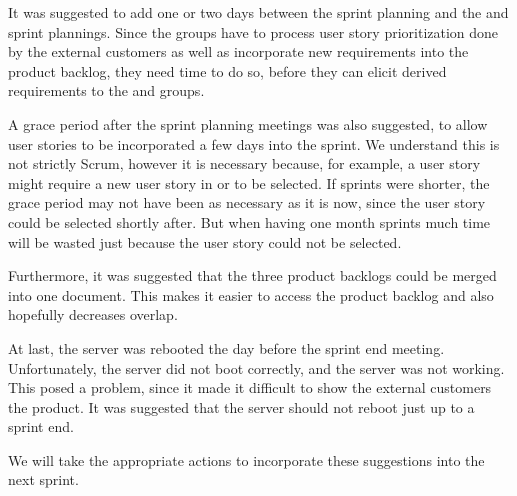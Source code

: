 It was suggested to add one or two days between the \gui sprint planning and the \db and \bd sprint plannings. Since the \gui groups have to process user story prioritization done by the external customers as well as incorporate new requirements into the product backlog, they need time to do so, before they can elicit derived requirements to the \db and \bd groups.

A grace period after the sprint planning meetings was also suggested, to allow user stories to be incorporated a few days into the sprint. We understand this is not strictly Scrum, however it is necessary because, for example, a \db user story might require a new user story in \gui or \bd to be selected. If sprints were shorter, the grace period may not have been as necessary as it is now, since the user story could be selected shortly after. But when having one month sprints much time will be wasted just because the user story could not be selected.

Furthermore, it was suggested that the three product backlogs could be merged into one document. This makes it easier to access the product backlog and also hopefully decreases overlap.

At last, the server was rebooted the day before the \gui sprint end meeting. Unfortunately, the server did not boot correctly, and the server was not working. This posed a problem, since it made it difficult to show the external customers the product. It was suggested that the server should not reboot just up to a sprint end.

We will take the appropriate actions to incorporate these suggestions into the next sprint.